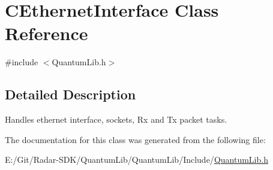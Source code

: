 \hypertarget{class_c_ethernet_interface}{}\section{C\+Ethernet\+Interface Class Reference}
\label{class_c_ethernet_interface}


{\ttfamily \#include $<$Quantum\+Lib.\+h$>$}



\subsection{Detailed Description}
Handles ethernet interface, sockets, Rx and Tx packet tasks. 

The documentation for this class was generated from the following file\+:\begin{DoxyCompactItemize}
\item 
E\+:/\+Git/\+Radar-\/\+S\+D\+K/\+Quantum\+Lib/\+Quantum\+Lib/\+Include/\mbox{\hyperlink{_quantum_lib_8h}{Quantum\+Lib.\+h}}\end{DoxyCompactItemize}
